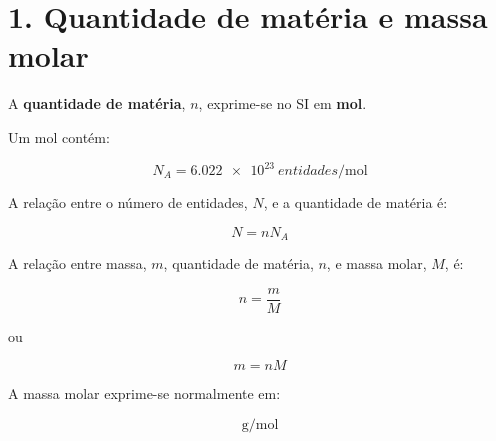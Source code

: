 \documentclass[11pt,a4paper]{article}
\begin{document}
	
	\section*{\textcolor{eublue}{1. Quantidade de matéria e massa molar}}
	
	\begin{recorda}
		
		A \textbf{quantidade de matéria}, \(n\), exprime-se no SI em
		\textbf{mol}.
		
		Um mol contém:
		
		\[
		\boxed{
			N_A=\SI{6.022e23}{entidades\per\mole}
		}
		\]
		
		A relação entre o número de entidades, \(N\), e a quantidade de matéria
		é:
		
		\[
		\boxed{
			N=nN_A
		}
		\]
		
		A relação entre massa, \(m\), quantidade de matéria, \(n\), e massa
		molar, \(M\), é:
		
		\[
		\boxed{
			n=\frac{m}{M}
		}
		\]
		
		ou
		
		\[
		\boxed{
			m=nM
		}
		\]
		
		A massa molar exprime-se normalmente em:
		
		\[
		\si{\gram\per\mole}
		\]
		
	\end{recorda}
	
	
\end{document}

